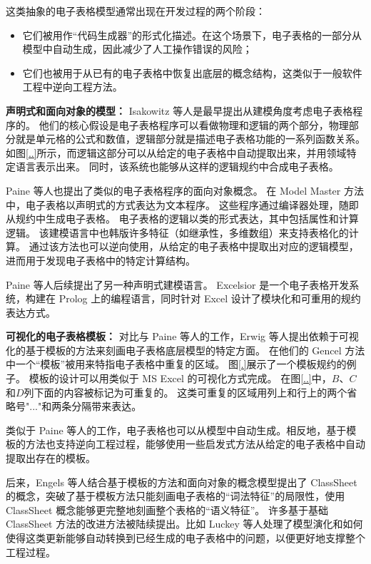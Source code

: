 这类抽象的电子表格模型通常出现在开发过程的两个阶段：
\begin{itemize}
    \item 它们被用作“代码生成器”的形式化描述。在这个场景下，电子表格的一部分从模型中自动生成，因此减少了人工操作错误的风险；
    \item 它们也被用于从已有的电子表格中恢复出底层的概念结构，这类似于一般软件工程中逆向工程方法。
\end{itemize}

\textbf{声明式和面向对象的模型：}
Isakowitz 等人\cite{isakowitz1995toward}是最早提出从建模角度考虑电子表格程序的。
他们的核心假设是电子表格程序可以看做物理和逻辑的两个部分，物理部分就是单元格的公式和数值，逻辑部分就是描述电子表格功能的一系列函数关系。
如图\ref{..}所示，而逻辑这部分可以从给定的电子表格中自动提取出来，并用领域特定语言表示出来。
同时，该系统也能够从这样的逻辑规约中合成电子表格。

Paine 等人\cite{ireson1997model,paine2008ensuring}也提出了类似的电子表格程序的面向对象概念。
在 Model Master 方法中，电子表格以声明式的方式表达为文本程序。
这些程序通过编译器处理，随即从规约中生成电子表格。
电子表格的逻辑以类的形式表达，其中包括属性和计算逻辑。
该建模语言中也韩版许多特征（如继承性，多维数组）来支持表格化的计算。
通过该方法也可以逆向使用，从给定的电子表格中提取出对应的逻辑模型，进而用于发现电子表格中的特定计算结构\cite{paine2008spreadsheet}。

Paine 等人\cite{paine2005bringing,paine2008rapid}后续提出了另一种声明式建模语言。
Excelsior 是一个电子表格开发系统，构建在 Prolog 上的编程语言，同时针对 Excel 设计了模块化和可重用的规约表达方式。


\textbf{可视化的电子表格模板：}
对比与 Paine 等人的工作，Erwig 等人\cite{erwig2004gencel,erwig2005automatic,abraham2005goal}提出依赖于可视化的基于模板的方法来刻画电子表格底层模型的特定方面。
在他们的 Gencel 方法中一个“模板”被用来特指电子表格中重复的区域。
图\ref{.}展示了一个模板规约的例子。
模板的设计可以用类似于 MS Excel 的可视化方式完成。
在图\ref{..}中，$B$、$C$和$D$列下面的内容被标记为可重复的。
这类可重复的区域用列上和行上的两个省略号"..."和两条分隔带来表达。

类似于 Paine 等人的工作，电子表格也可以从模型中自动生成。相反地，基于模板的方法也支持逆向工程过程，能够使用一些启发式方法从给定的电子表格中自动提取出存在的模板\cite{abraham2006inferring}。

后来，Engels 等人\cite{engels2005classsheets,cunha2010automatically}结合基于模板的方法和面向对象的概念模型提出了 ClassSheet 的概念，突破了基于模板方法只能刻画电子表格的“词法特征”的局限性，使用 ClassSheet 概念能够更完整地刻画整个表格的“语义特征”。
许多基于基础 ClassSheet 方法的改进方法被陆续提出\cite{luckey2012systematic,cunha2011type,cunha2011embedding,cunha2012bidirectional}。比如 Luckey 等人\cite{luckey2012systematic}处理了模型演化和如何使得这类更新能够自动转换到已经生成的电子表格中的问题，以便更好地支撑整个工程过程。

